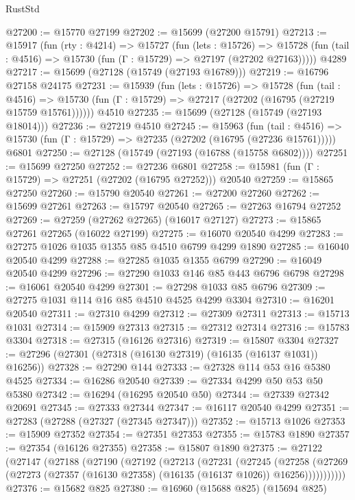 \begin{lexlean}{RustStd}
\begin{coremodule}
@27200 := @15770 @27199
@27202 := @15699 (@27200 @15791)
@27213 := @15917
    (fun (rty : @4214) =>
    @15727
      (fun (lets : @15726) =>
      @15728 (fun (tail : @4516) => @15730 (fun (Γ : @15729) => @27197 (@27202 @27163)))))
    @4289
@27217 := @15699 (@27128 (@15749 (@27193 @16789)))
@27219 := @16796 @27158 @24175
@27231 := @15939
    (fun (lets : @15726) =>
    @15728
      (fun (tail : @4516) =>
      @15730 (fun (Γ : @15729) => @27217 (@27202 (@16795 (@27219 @15759 @15761))))))
    @4510
@27235 := @15699 (@27128 (@15749 (@27193 @18014)))
@27236 := @27219 @4510
@27245 := @15963
    (fun (tail : @4516) => @15730 (fun (Γ : @15729) => @27235 (@27202 (@16795 (@27236 @15761)))))
    @6801
@27250 := @27128 (@15749 (@27193 (@16788 (@15758 @6802))))
@27251 := @15699 @27250
@27252 := @27236 @6801
@27258 := @15981 (fun (Γ : @15729) => @27251 (@27202 (@16795 @27252))) @20540
@27259 := @15865 @27250
@27260 := @15790 @20540
@27261 := @27200 @27260
@27262 := @15699 @27261
@27263 := @15797 @20540
@27265 := @27263 @16794 @27252
@27269 := @27259 (@27262 @27265) (@16017 @27127)
@27273 := @15865 @27261 @27265 (@16022 @27199)
@27275 := @16070 @20540 @4299
@27283 := @27275 @1026 @1035 @1355 @85 @4510 @6799 @4299 @1890
@27285 := @16040 @20540 @4299
@27288 := @27285 @1035 @1355 @6799
@27290 := @16049 @20540 @4299
@27296 := @27290 @1033 @146 @85 @443 @6796 @6798
@27298 := @16061 @20540 @4299
@27301 := @27298 @1033 @85 @6796
@27309 := @27275 @1031 @114 @16 @85 @4510 @4525 @4299 @3304
@27310 := @16201 @20540
@27311 := @27310 @4299
@27312 := @27309 @27311
@27313 := @15713 @1031
@27314 := @15909 @27313
@27315 := @27312 @27314
@27316 := @15783 @3304
@27318 := @27315 (@16126 @27316)
@27319 := @15807 @3304
@27327 := @27296 (@27301 (@27318 (@16130 @27319) (@16135 (@16137 @1031)) @16256))
@27328 := @27290 @144
@27333 := @27328 @114 @53 @16 @5380 @4525
@27334 := @16286 @20540
@27339 := @27334 @4299 @50 @53 @50 @5380
@27342 := @16294 (@16295 @20540 @50)
@27344 := @27339 @27342 @20691
@27345 := @27333 @27344
@27347 := @16117 @20540 @4299
@27351 := @27283 (@27288 (@27327 (@27345 @27347)))
@27352 := @15713 @1026
@27353 := @15909 @27352
@27354 := @27351 @27353
@27355 := @15783 @1890
@27357 := @27354 (@16126 @27355)
@27358 := @15807 @1890
@27375 := @27122
    (@27147
      (@27188
        (@27190
          (@27192
            (@27213
              (@27231
                (@27245
                  (@27258
                    (@27269
                      (@27273 (@27357 (@16130 @27358) (@16135 (@16137 @1026)) @16256)))))))))))
@27376 := @15682 @825
@27380 := @16960 (@15688 @825) (@15694 @825)

\end{coremodule}
\end{lexlean}
